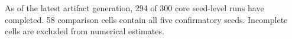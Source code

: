 As of the latest artifact generation, 294 of 300 core seed-level runs have completed. 58 comparison cells contain all five confirmatory seeds. Incomplete cells are excluded from numerical estimates.
